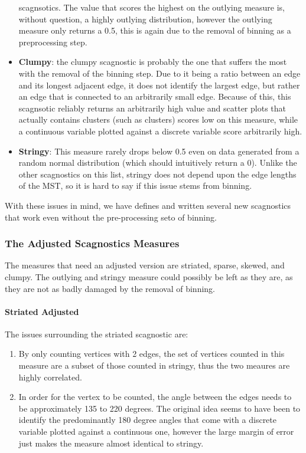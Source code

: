 \begin{itemize}
  scagnsotics. The value that scores the highest on the outlying measure
  is, without question, a highly outlying distribution, however the
  outlying measure only returns a 0.5, this is again due to the removal
  of binning as a preprocessing step.
\item
  \textbf{Clumpy}: the clumpy scagnostic is probably the one that
  suffers the most with the removal of the binning step. Due to it being
  a ratio between an edge and its longest adjacent edge, it does not
  identify the largest edge, but rather an edge that is connected to an
  arbitrarily small edge. Because of this, this scagnsotic reliably
  returns an arbitrarily high value and scatter plots that actually
  contains clusters (such as clusters) scores low on this measure, while
  a continuous variable plotted against a discrete variable score
  arbitrarily high.
\item
  \textbf{Stringy}: This measure rarely drops below 0.5 even on data
  generated from a random normal distribution (which should intuitively
  return a 0). Unlike the other scagnostics on this list, stringy does
  not depend upon the edge lengths of the MST, so it is hard to say if
  this issue stems from binning.
\end{itemize}

With these issues in mind, we have defines and written several new
scagnostics that work even without the pre-processing seto of binning.

\hypertarget{the-adjusted-scagnostics-measures}{%
\subsubsection{The Adjusted Scagnostics
Measures}\label{the-adjusted-scagnostics-measures}}

The measures that need an adjusted version are striated, sparse, skewed,
and clumpy. The outlying and stringy measure could possibly be left as
they are, as they are not as badly damaged by the removal of binning.

\hypertarget{striated-adjusted}{%
\paragraph{Striated Adjusted}\label{striated-adjusted}}

The issues surrounding the striated scagnostic are:

\begin{enumerate}
\def\labelenumi{\arabic{enumi}.}
\item
  By only counting vertices with 2 edges, the set of vertices counted in
  this measure are a subset of those counted in stringy, thus the two
  meaures are highly correlated.
\item
  In order for the vertex to be counted, the angle between the edges
  needs to be approximately 135 to 220 degrees. The original idea seems
  to have been to identify the predominantly 180 degree angles that come
  with a discrete variable plotted against a continuous one, however the
  large margin of error just makes the measure almost identical to
  stringy.
\end{enumerate}


